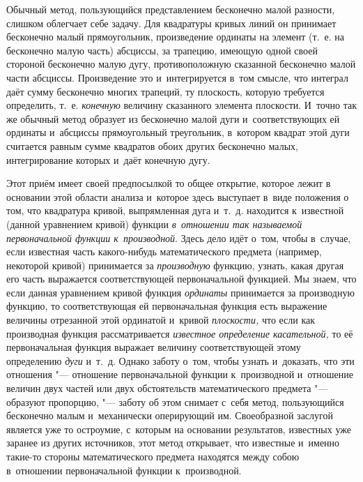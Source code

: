 Обычный метод, пользующийся представлением бесконечно малой разности, слишком
облегчает себе задачу. Для квадратуры кривых линий он принимает бесконечно
малый прямоугольник, произведение ординаты на элемент (т.~е. на бесконечно малую
часть) абсциссы, за трапецию, имеющую одной своей стороной бесконечно малую
дугу, противоположную сказанной бесконечно малой части абсциссы. Произведение
это и~интегрируется в~том смысле, что интеграл даёт сумму бесконечно многих
трапеций, ту плоскость, которую требуется определить, т.~е. {\em конечную}
величину сказанного элемента плоскости. И~точно так же обычный метод образует
из бесконечно малой дуги и~соответствующих ей ординаты и~абсциссы прямоугольный
треугольник, в~котором квадрат этой дуги считается равным сумме квадратов обоих
других бесконечно малых, интегрирование которых и~даёт конечную дугу.

Этот приём имеет своей предпосылкой то общее открытие, которое лежит в
основании этой области анализа и~которое здесь выступает в~виде положения о
том, что квадратура кривой, выпрямленная дуга и~т.~д. находится к~известной
(данной уравнением кривой) функции {\em в~отношении так называемой
первоначальной функции к~производной}. Здесь дело идёт о~том, чтобы в~случае,
если известная часть какого-нибудь математического предмета (например,
некоторой кривой) принимается за {\em производную} функцию, узнать, какая другая его
часть выражается соответствующей первоначальной функцией. Мы знаем, что если
данная уравнением кривой функция {\em ординаты} принимается за производную
функцию, то соответствующая ей первоначальная функция есть выражение величины
отрезанной этой ординатой и~кривой {\em плоскости,} что если как производная
функция рассматривается {\em известное определение касательной,} то её
первоначальная функция выражает величину соответствующей этому определению
{\em дуги} и~т.~д. Однако заботу о~том, чтобы узнать и~доказать, что эти
отношения "--- отношение первоначальной функции к~производной и~отношение
величин двух частей или двух обстоятельств математического предмета "---
образуют пропорцию, "--- заботу об этом снимает с~себя метод, пользующийся
бесконечно малым и~механически оперирующий им. Своеобразной заслугой является
уже то остроумие, с~которым на основании результатов, известных уже заранее из
других источников, этот метод открывает, что известные и~именно такие-то
стороны математического предмета находятся между собою в~отношении
первоначальной функции к~производной.

